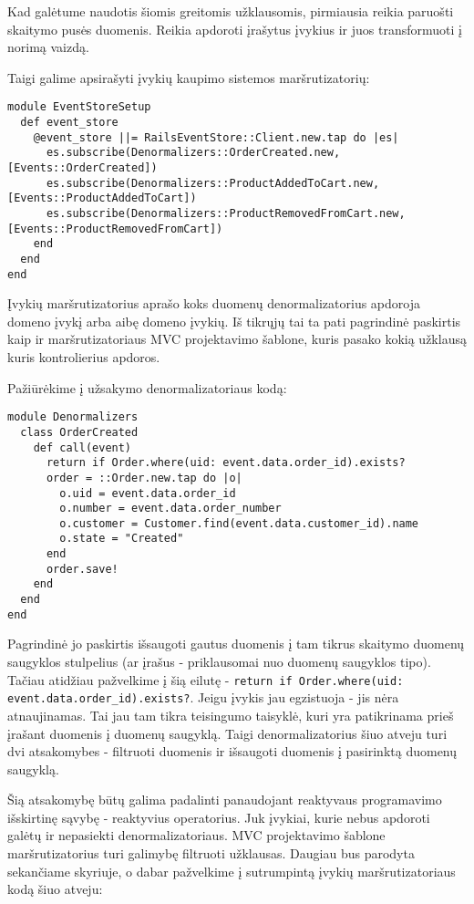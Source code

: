 Kad galėtume naudotis šiomis greitomis užklausomis, pirmiausia reikia paruošti skaitymo pusės duomenis. Reikia apdoroti įrašytus įvykius ir juos transformuoti į norimą vaizdą.

Taigi galime apsirašyti įvykių kaupimo sistemos maršrutizatorių:

\begin{lstlisting}
module EventStoreSetup
  def event_store
    @event_store ||= RailsEventStore::Client.new.tap do |es|
      es.subscribe(Denormalizers::OrderCreated.new, [Events::OrderCreated])
      es.subscribe(Denormalizers::ProductAddedToCart.new, [Events::ProductAddedToCart])
      es.subscribe(Denormalizers::ProductRemovedFromCart.new, [Events::ProductRemovedFromCart])
    end
  end
end
\end{lstlisting}

Įvykių maršrutizatorius aprašo koks duomenų denormalizatorius apdoroja domeno įvykį arba aibę domeno įvykių. Iš tikrųjų tai ta pati pagrindinė paskirtis kaip ir maršrutizatoriaus MVC projektavimo šablone, kuris pasako kokią užklausą kuris kontrolierius apdoros.

Pažiūrėkime į užsakymo denormalizatoriaus kodą:

\begin{lstlisting}
module Denormalizers
  class OrderCreated
    def call(event)
      return if Order.where(uid: event.data.order_id).exists?
      order = ::Order.new.tap do |o|
        o.uid = event.data.order_id
        o.number = event.data.order_number
        o.customer = Customer.find(event.data.customer_id).name
        o.state = "Created"
      end
      order.save!
    end
  end
end
\end{lstlisting}

Pagrindinė jo paskirtis išsaugoti gautus duomenis į tam tikrus skaitymo duomenų saugyklos stulpelius (ar įrašus - priklausomai nuo duomenų saugyklos tipo). Tačiau atidžiau pažvelkime į šią eilutę - \lstinline|return if Order.where(uid: event.data.order_id).exists?|. Jeigu įvykis jau egzistuoja - jis nėra atnaujinamas. Tai jau tam tikra teisingumo taisyklė, kuri yra patikrinama prieš įrašant duomenis į duomenų saugyklą. Taigi denormalizatorius šiuo atveju turi dvi atsakomybes - filtruoti duomenis ir išsaugoti duomenis į pasirinktą duomenų saugyklą.

Šią atsakomybę būtų galima padalinti panaudojant reaktyvaus programavimo išskirtinę sąvybę - reaktyvius operatorius. Juk įvykiai, kurie nebus apdoroti galėtų ir nepasiekti denormalizatoriaus. MVC projektavimo šablone maršrutizatorius turi galimybę filtruoti užklausas. Daugiau bus parodyta sekančiame skyriuje, o dabar pažvelkime į sutrumpintą įvykių maršrutizatoriaus kodą šiuo atveju:

